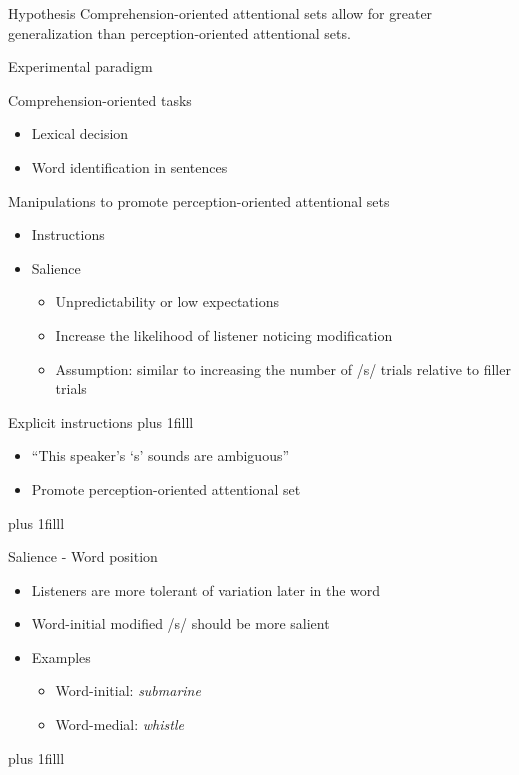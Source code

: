 \documentclass{beamer}
\newcommand{\btVFill}{\vskip0pt plus 1filll}
\begin{document}
\begin{frame}{Hypothesis}
\vfill
Comprehension-oriented attentional sets allow for greater generalization than perception-oriented attentional sets.
\vfill
\end{frame}

\begin{frame}{Experimental paradigm}

Comprehension-oriented tasks
\begin{itemize}
\item Lexical decision
\item Word identification in sentences
\end{itemize}

Manipulations to promote perception-oriented attentional sets
\begin{itemize}
\item Instructions
\item Salience
\begin{itemize}
\item Unpredictability or low expectations
\item Increase the likelihood of listener noticing modification
\item Assumption: similar to increasing the number of /s/ trials relative to filler trials

\end{itemize}

\end{itemize}

\end{frame}

\begin{frame}{Explicit instructions}
\btVFill
\begin{itemize}
\item ``This speaker's `s' sounds are ambiguous''
\item Promote perception-oriented attentional set
\end{itemize}

\btVFill
\begin{flushright}
\scriptsize
\citet{Pitt2012}
\end{flushright}
\end{frame}

\begin{frame}{Salience - Word position}

\begin{itemize}
\item Listeners are more tolerant of variation later in the word
\item Word-initial modified /s/ should be more salient
\item Examples
\begin{itemize}
\item Word-initial: \emph{submarine}
\item Word-medial: \emph{whistle}
\end{itemize}
\end{itemize}
\btVFill
\begin{flushright}
\scriptsize
\citet{Pitt2012}
\end{flushright}
\end{frame}
\end{document}
